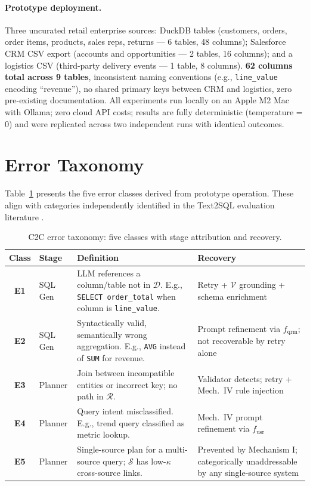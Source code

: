 \documentclass[11pt,a4paper]{article}
\begin{document}
\paragraph{Prototype deployment.}
Three uncurated retail enterprise sources: DuckDB tables (customers, orders, order
items, products, sales reps, returns --- 6 tables, 48 columns); Salesforce CRM CSV
export (accounts and opportunities --- 2 tables, 16 columns); and a logistics CSV
(third-party delivery events --- 1 table, 8 columns).  \textbf{62 columns total
across 9 tables}, inconsistent naming conventions (e.g., \texttt{line\_value}
encoding ``revenue''), no shared primary keys between CRM and logistics, zero
pre-existing documentation.  All experiments run locally on an Apple M2 Mac with
Ollama; zero cloud API costs; results are fully deterministic (temperature = 0)
and were replicated across two independent runs with identical outcomes.

\section{Error Taxonomy}\label{sec:taxonomy}

Table~\ref{tab:taxonomy} presents the five error classes derived from prototype
operation.  These align with categories independently identified in the Text2SQL
evaluation literature \citep{lei2024spider2,shi2024survey,li2023bird}.

\begin{table}[htbp]
\centering
\caption{C2C error taxonomy: five classes with stage attribution and recovery.}
\label{tab:taxonomy}
\small
\begin{tabular}{clp{4.2cm}p{3.8cm}}
\toprule
\textbf{Class} & \textbf{Stage} & \textbf{Definition} & \textbf{Recovery} \\
\midrule
\textbf{E1} & SQL Gen & LLM references a column/table not in $\mathcal{D}$. E.g., \texttt{SELECT order\_total} when column is \texttt{line\_value}. & Retry + $\mathcal{V}$ grounding + schema enrichment \\[3pt]
\textbf{E2} & SQL Gen & Syntactically valid, semantically wrong aggregation. E.g., \texttt{AVG} instead of \texttt{SUM} for revenue. & Prompt refinement via $f_\mathrm{qrm}$; not recoverable by retry alone \\[3pt]
\textbf{E3} & Planner & Join between incompatible entities or incorrect key; no path in $\mathcal{R}$. & Validator detects; retry + Mech.\ IV rule injection \\[3pt]
\textbf{E4} & Planner & Query intent misclassified. E.g., trend query classified as metric lookup. & Mech.\ IV prompt refinement via $f_\mathrm{usr}$ \\[3pt]
\textbf{E5} & Planner & Single-source plan for a multi-source query; $\mathcal{S}$ has low-$\kappa$ cross-source links. & Prevented by Mechanism I; categorically unaddressable by any single-source system \\
\bottomrule
\end{tabular}
\end{table}
\end{document}
